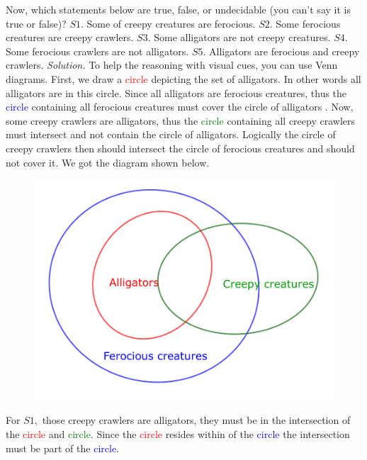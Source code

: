\begin{multicols}{2}
{	Now, which statements below are true, false, or undecidable (you can't say it is true or false)?
	\vskip 0.1cm
	$S1.$ Some of creepy creatures are ferocious.
	\vskip 0.1cm
	$S2.$ Some ferocious creatures are creepy crawlers.
	\vskip 0.1cm
	$S3.$ Some alligators are not creepy creatures.
	\vskip 0.1cm
	$S4.$ Some ferocious crawlers are not alligators.
	\vskip 0.1cm
	$S5.$ Alligators are ferocious and creepy crawlers.}
	\vskip 0.2cm
	\textit{Solution.} To help the reasoning with visual cues, you can use Venn diagrams.
	\vskip 0.1cm
	First, we draw a \textcolor{red}{circle} depicting the set of alligators. In other words all alligators are in this circle.
	Since all alligators are ferocious creatures, thus the \textcolor{blue}{circle} containing all ferocious creatures must cover the circle of alligators .
	Now, some creepy crawlers are alligators, thus the \textcolor{green}{circle} containing all creepy crawlers must intersect and not contain the circle of alligators.
	Logically the circle of creepy crawlers then should intersect the circle of ferocious creatures and should not cover it.
	We got the diagram shown below.
	\begin{figure}[H]
		\vspace*{-5pt}
		\centering
		\captionsetup{labelformat= empty, justification=centering}
		\includegraphics[width= 1\linewidth]{pi-2023-01-03.pdf}
		\vspace*{-10pt}
	\end{figure}	
	For $S1,$ those creepy crawlers are alligators, they must be in the intersection of the \textcolor{red}{circle} and \textcolor{green}{circle}.
	Since the \textcolor{red}{circle} resides within of the \textcolor{blue}{circle} the intersection must be part of the \textcolor{blue}{circle}.

\end{multicols}
